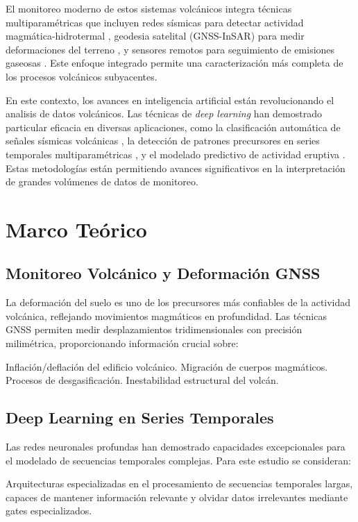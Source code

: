 \documentclass[11pt,a4paper]{article}
\begin{document}
El monitoreo moderno de estos sistemas volcánicos integra técnicas multiparamétricas que incluyen redes sísmicas para detectar actividad magmática-hidrotermal \citep{chouet2022seismic}, geodesia satelital (GNSS-InSAR) para medir deformaciones del terreno \citep{pritchard2022satellite}, y sensores remotos para seguimiento de emisiones gaseosas \citep{carn2023gas}. Este enfoque integrado permite una caracterización más completa de los procesos volcánicos subyacentes.

En este contexto, los avances en inteligencia artificial están revolucionando el analisis de datos volcánicos. Las técnicas de \textit{deep learning} han demostrado particular eficacia en diversas aplicaciones, como la clasificación automática de señales sísmicas volcánicas \citep{beyreuther2020machine}, la detección de patrones precursores en series temporales multiparamétricas \citep{corbi2021machine}, y el modelado predictivo de actividad eruptiva \citep{bosman2023forecasting}. Estas metodologías están permitiendo avances significativos en la interpretación de grandes volúmenes de datos de monitoreo.


\section{Marco Teórico}

\subsection{Monitoreo Volcánico y Deformación GNSS}

La deformación del suelo es uno de los precursores más confiables de la actividad volcánica, reflejando movimientos magmáticos en profundidad. Las técnicas GNSS permiten medir desplazamientos tridimensionales con precisión milimétrica, proporcionando información crucial sobre:

Inflación/deflación del edificio volcánico.
Migración de cuerpos magmáticos.
Procesos de desgasificación.
Inestabilidad estructural del volcán.


\subsection{Deep Learning en Series Temporales}

Las redes neuronales profundas han demostrado capacidades excepcionales para el modelado de secuencias temporales complejas. Para este estudio se consideran:

 Arquitecturas especializadas en el procesamiento de secuencias temporales largas, capaces de mantener información relevante y olvidar datos irrelevantes mediante gates especializados.
\end{document}
